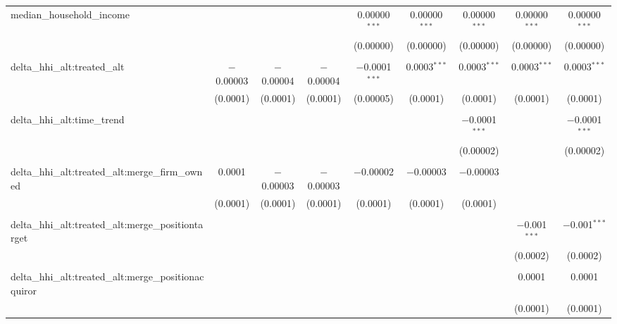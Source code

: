 \begin{table}[H]
{\begin{tabular}{@{\extracolsep{5pt}}lcccccccc}
  median\_household\_income &  &  &  & 0.00000$^{***}$ & 0.00000$^{***}$ & 0.00000$^{***}$ & 0.00000$^{***}$ & 0.00000$^{***}$ \\  

   &  &  &  & (0.00000) & (0.00000) & (0.00000) & (0.00000) & (0.00000) \\  

   & & & & & & & & \\  

  delta\_hhi\_alt:treated\_alt & $-$0.00003 & $-$0.00004 & $-$0.00004 & $-$0.0001$^{***}$ & 0.0003$^{***}$ & 0.0003$^{***}$ & 0.0003$^{***}$ & 0.0003$^{***}$ \\  

   & (0.0001) & (0.0001) & (0.0001) & (0.00005) & (0.0001) & (0.0001) & (0.0001) & (0.0001) \\  

   & & & & & & & & \\  

  delta\_hhi\_alt:time\_trend &  &  &  &  &  & $-$0.0001$^{***}$ &  & $-$0.0001$^{***}$ \\  

   &  &  &  &  &  & (0.00002) &  & (0.00002) \\  

   & & & & & & & & \\  

  delta\_hhi\_alt:treated\_alt:merge\_firm\_owned & 0.0001 & $-$0.00003 & $-$0.00003 & $-$0.00002 & $-$0.00003 & $-$0.00003 &  &  \\  

   & (0.0001) & (0.0001) & (0.0001) & (0.0001) & (0.0001) & (0.0001) &  &  \\  

   & & & & & & & & \\  

  delta\_hhi\_alt:treated\_alt:merge\_positiontarget &  &  &  &  &  &  & $-$0.001$^{***}$ & $-$0.001$^{***}$ \\  

   &  &  &  &  &  &  & (0.0002) & (0.0002) \\  

   & & & & & & & & \\  

  delta\_hhi\_alt:treated\_alt:merge\_positionacquiror &  &  &  &  &  &  & 0.0001 & 0.0001 \\  

   &  &  &  &  &  &  & (0.0001) & (0.0001) \\  


\end{tabular}}
\end{table}
